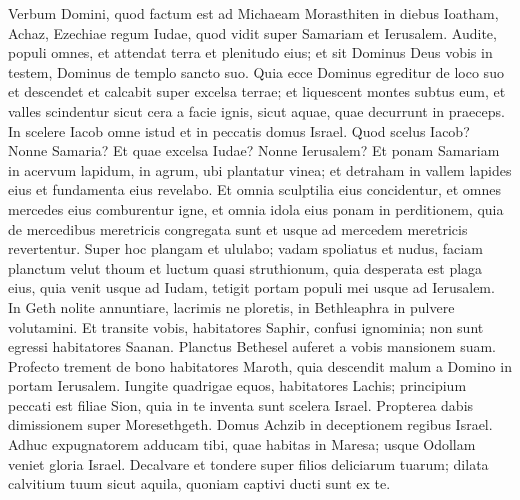 \begin{biblechapter}
 \verse Verbum Domini, quod factum est ad Michaeam Morasthiten in diebus Ioatham, Achaz, Ezechiae regum Iudae, quod vidit super Samariam et Ierusalem.
 \verse Audite, populi omnes,
 et attendat terra et plenitudo eius;
 et sit Dominus Deus vobis in testem,
 Dominus de templo sancto suo.
 \verse Quia ecce Dominus egreditur de loco suo
 et descendet et calcabit
 super excelsa terrae;
 \verse et liquescent montes subtus eum,
 et valles scindentur
 sicut cera a facie ignis,
 sicut aquae, quae decurrunt in praeceps.
 \verse In scelere Iacob omne istud
 et in peccatis domus Israel.
 Quod scelus Iacob?
 Nonne Samaria?
 Et quae excelsa Iudae?
 Nonne Ierusalem?
 \verse Et ponam Samariam in acervum lapidum,
 in agrum, ubi plantatur vinea;
 et detraham in vallem lapides eius
 et fundamenta eius revelabo.
 \verse Et omnia sculptilia eius concidentur,
 et omnes mercedes eius comburentur igne,
 et omnia idola eius ponam in perditionem,
 quia de mercedibus meretricis congregata sunt
 et usque ad mercedem meretricis revertentur.
 \verse Super hoc plangam et ululabo;
 vadam spoliatus et nudus,
 faciam planctum velut thoum
 et luctum quasi struthionum,
 \verse quia desperata est plaga eius,
 quia venit usque ad Iudam,
 tetigit portam populi mei
 usque ad Ierusalem.
 \verse In Geth nolite annuntiare,
 lacrimis ne ploretis,
 in Bethleaphra in pulvere volutamini.
 \verse Et transite vobis, habitatores Saphir,
 confusi ignominia;
 non sunt egressi habitatores Saanan.
 Planctus Bethesel
 auferet a vobis mansionem suam.
 \verse Profecto trement de bono
 habitatores Maroth,
 quia descendit malum a Domino
 in portam Ierusalem.
 \verse Iungite quadrigae equos, habitatores Lachis;
 principium peccati est filiae Sion,
 quia in te inventa sunt scelera Israel.
 \verse Propterea dabis dimissionem
 super Moresethgeth.
 Domus Achzib in deceptionem
 regibus Israel.
 \verse Adhuc expugnatorem adducam tibi,
 quae habitas in Maresa;
 usque Odollam veniet
 gloria Israel.
 \verse Decalvare et tondere
 super filios deliciarum tuarum;
 dilata calvitium tuum sicut aquila, quoniam captivi ducti sunt ex te.
 

\end{biblechapter}
